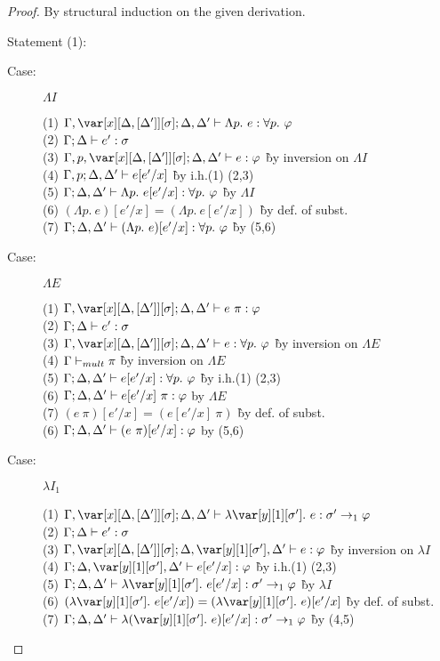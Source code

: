 \begin{proof}
By structural induction on the given derivation.

Statement (1):
\begin{description}

\item[Case:] $\Lambda I$
\begin{tabbing}
    (1) $\G, \xD; \D, \D' \vdash \Lambda p.~e : \forall p.~\vp$\\
    (2) $\Gamma; \Delta \vdash e' : \sigma$\\
    (3) $\G, p, \xD; \D, \D' \vdash e : \vp$ \` by inversion on $\Lambda I$\\
    (4) $\Gamma, p; \Delta, \Delta' \vdash e[e'/x]$ \` by i.h.(1) (2,3)\\
    (5) $\Gamma; \Delta, \Delta' \vdash \Lambda p.~e[e'/x] : \forall p.~\varphi$ \` by $\Lambda I$ \\
    (6) $(\Lambda p.~e)[e'/x] = (\Lambda p.~e[e'/x])$ \` by def. of subst.\\
    (7) $\Gamma; \Delta, \Delta' \vdash (\Lambda p.~e)[e'/x] : \forall p.~\varphi$ \` by (5,6)\\
\end{tabbing}

\item[Case:] $\Lambda E$
\begin{tabbing}
    (1) $\G,\xD; \D,\D' \vdash e~\pi : \vp$\\
    (2) $\Gamma; \Delta \vdash e' : \sigma$\\
    (3) $\G,\xD; \D, \D' \vdash e : \forall p.~\vp$ \` by inversion on $\Lambda E$\\
    (4) $\Gamma \vdash_{mult} \pi$ \` by inversion on $\Lambda E$\\
    (5) $\Gamma; \Delta, \Delta' \vdash e[e'/x] : \forall p.~\varphi$ \` by i.h.(1) (2,3)\\
    (6) $\Gamma; \Delta, \Delta' \vdash e[e'/x]~\pi : \varphi$ by $\Lambda E$\\
    (7) $(e~\pi)[e'/x] = (e[e'/x]~\pi)$ \` by def. of subst.\\
    (6) $\Gamma; \Delta, \Delta' \vdash (e~\pi)[e'/x] : \varphi$ by (5,6)\\
\end{tabbing}

\item[Case:] $\lambda I_1$
\begin{tabbing}
    (1) $\G, \xD; \D, \D' \vdash \lambda \y[1][\s'].~e : \s' \to_1 \vp$\\
    (2) $\Gamma; \Delta \vdash e' : \sigma$\\
    (3) $\G, \xD; \D, \y[1][\s'], \D' \vdash e : \vp$ \` by inversion on $\lambda I$\\
    (4) $\G; \D, \y[1][\s'], \D' \vdash e[e'/x] : \vp$ \` by i.h.(1) (2,3)\\
    (5) $\G; \D, \D' \vdash \lambda \y[1][\s'].~e[e'/x] : \s' \to_1 \vp$ \` by $\lambda I$\\
    (6) $(\lambda \y[1][\s'].~e[e'/x]) = (\lambda \y[1][\s'].~e)[e'/x]$ \` by def. of subst.\\
    (7) $\G; \D, \D' \vdash \lambda (\y[1][\s'].~e)[e'/x] : \s' \to_1 \vp$ \` by (4,5)\\
\end{tabbing}


\end{description}
\end{proof}
